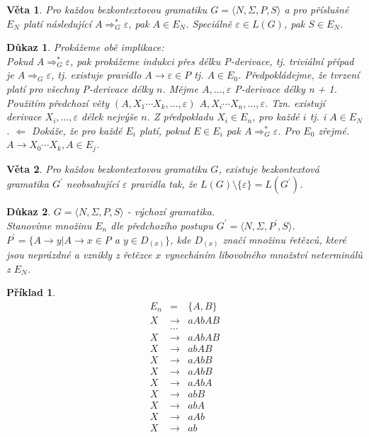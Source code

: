 \documentclass[10pt, a4paper, titlepage]{article}
\theoremstyle{note}
\newtheorem{veta}{\textbf{Věta}}
\newtheorem{dukaz}{\textbf{Důkaz}}
\newtheorem{priklad}{\textbf{Příklad}}
\begin{document}
\begin{veta}
Pro každou bezkontextovou gramatiku $G = \langle N, \Sigma, P,S \rangle$ a pro příslušné $E_{N}$ platí následující $A \Rightarrow_{G}^{*}\varepsilon$, pak $A \in E_{N}$. 
Speciálně $\varepsilon \in L(G)$, pak $S \in E_{N}$.
\end{veta}

\begin{dukaz}
Prokážeme obě implikace: \\
Pokud $A \Rightarrow_{G}^{*}\varepsilon$, pak prokážeme indukci přes délku P-derivace, tj. triviální případ je $A \Rightarrow_{G}\varepsilon$, 
tj. existuje pravidlo $A \rightarrow \varepsilon \in P$ tj. $A \in E_{0}$.
Předpokládejme, že tvrzení platí pro všechny P-derivace délky $n$.
Mějme $A, \ldots, \varepsilon$ P-derivace délky n + 1. Použitím předchozí věty $(A, X_{1} \cdots X_{k}, \ldots, \varepsilon)$ $A, X_{i} \cdots X_{n}, \ldots, \varepsilon$.
Tzn. existují derivace $X_{i}, \ldots, \varepsilon$ délek nejvýše $n$. Z předpokladu $X_{i} \in E_{n}$, pro každé $i$ tj. i $A \in E_{N}$. 
$\Leftarrow$ Dokáže, že pro každé $E_{i}$ platí, pokud $E \in E_{i}$ pak $A \Rightarrow_{G}^{*}\varepsilon$. Pro $E_{0}$ zřejmé.
$A \rightarrow X_{0} \cdots X_{k}, A \in E_{j}$.
\end{dukaz}

\begin{veta}
Pro každou bezkontextovou gramatiku $G$, existuje bezkontextová gramatika $G^{'}$ neobsahující $\varepsilon$ pravidla tak, že $L(G) \setminus \lbrace \varepsilon \rbrace = L(G^{'})$.
\end{veta}

\begin{dukaz}
$G = \langle N, \Sigma, P,S \rangle$ - výchozí gramatika.\\
Stanovíme množinu $E_{n}$ dle předchozího postupu $G^{'} = \langle N, \Sigma, P^{'},S \rangle$.
$P^{'} = \lbrace A \rightarrow y|A \rightarrow x \in P$ a $y \in D_{(x)} \rbrace$, kde $D_{(x)}$ značí množinu řetězců, které jsou neprázdné 
a vznikly z řetězce $x$ vynecháním libovolného množství neterminálů z $E_{N}$.
\end{dukaz}

\begin{priklad}
\begin{eqnarray*}
E_{n} &=& \lbrace A, B \rbrace \\
X &\rightarrow& aAbAB \\
&\ldots& \\
X &\rightarrow& aAbAB \\
X &\rightarrow& abAB \\
X &\rightarrow& aAbB \\
X &\rightarrow& aAbB \\
X &\rightarrow& aAbA \\
X &\rightarrow& abB \\
X &\rightarrow& abA \\
X &\rightarrow& aAb \\
X &\rightarrow& ab
\end{eqnarray*}
\end{priklad}
\end{document}
